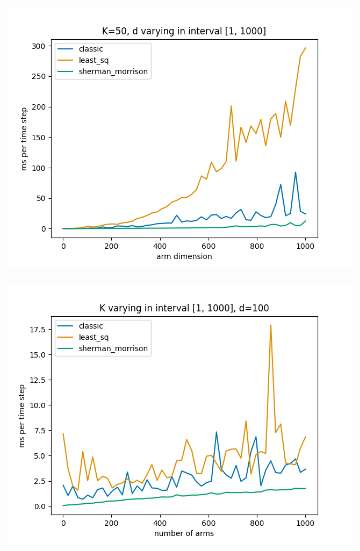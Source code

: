 \begin{figure}[h!]
  \centering
  \begin{subfigure}[b]{0.45\textwidth}
      \centering
      \includegraphics[width=\textwidth]{plots/d_varying_time.png}
      \label{fig:plot1}
  \end{subfigure}
  \hfill
  \begin{subfigure}[b]{0.45\textwidth}
      \centering
      \includegraphics[width=\textwidth]{plots/K_varying_time.png}
      \label{fig:plot2}
  \end{subfigure}
  \label{fig:combined_plots}
\end{figure}



